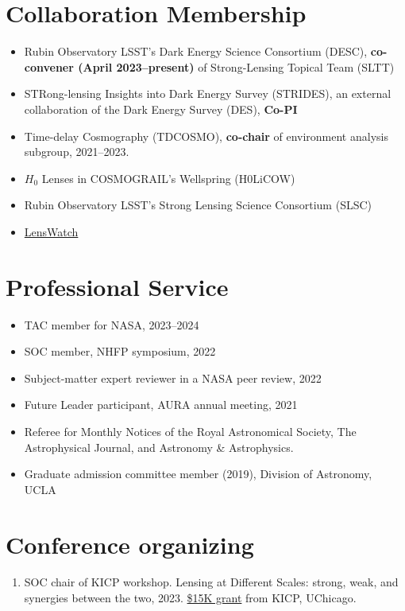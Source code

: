 \documentclass[margin, line]{res}
\begin{document}
\begin{resume}
\section{\sc Collaboration Membership}
\begin{itemize}
	\item Rubin Observatory LSST's Dark Energy Science Consortium (DESC), \textbf{co-convener (April 2023--present)} of Strong-Lensing Topical Team (SLTT) 
	\item STRong-lensing Insights into Dark Energy Survey (STRIDES), an external collaboration of the Dark Energy Survey (DES), \textbf{Co-PI}
	\item Time-delay Cosmography (TDCOSMO), \textbf{co-chair} of environment analysis subgroup, 2021--2023.
	\item $H_0$ Lenses in COSMOGRAIL's Wellspring (H0LiCOW)
	\item Rubin Observatory LSST's Strong Lensing Science Consortium (SLSC)
	\item \href{https://www.lenswatch.org/}{LensWatch}
\end{itemize}

\section{\sc Professional Service}
\begin{itemize}
\item TAC member for NASA, 2023--2024
\item SOC member, NHFP symposium, 2022
\item Subject-matter expert reviewer in a NASA peer review, 2022
\item Future Leader participant, AURA annual meeting, 2021
\item Referee for Monthly Notices of the Royal Astronomical Society, The Astrophysical Journal, and Astronomy \& Astrophysics.
\item Graduate admission committee member (2019), Division of Astronomy, UCLA
\end{itemize}

\section{\sc Conference organizing}
\begin{enumerate}
	\item SOC chair of KICP workshop. Lensing at Different Scales: strong, weak, and synergies between the two, 2023. \underline{\$15K grant} from KICP, UChicago.
\end{enumerate}


\end{resume}
\end{document}
